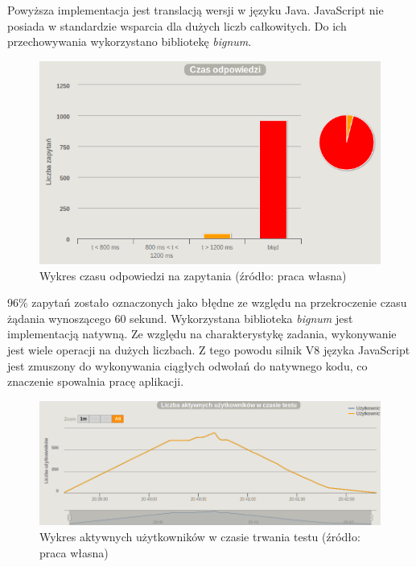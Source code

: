\documentclass[12pt,twoside]{article}
\begin{document}
Powyższa implementacja jest translacją wersji w języku Java. JavaScript
nie posiada w standardzie wsparcia dla dużych liczb całkowitych. Do ich
przechowywania wykorzystano bibliotekę \emph{bignum}.

\begin{figure}[htbp]
\centering
\includegraphics[resolution=150]{test_results/js/fibonacci/screenshots/response_times.png}
\caption{Wykres czasu odpowiedzi na zapytania (źródło: praca własna)}
\end{figure}

96\% zapytań zostało oznaczonych jako błędne ze względu na przekroczenie
czasu żądania wynoszącego 60 sekund. Wykorzystana biblioteka
\emph{bignum} jest implementacją natywną. Ze względu na charakterystykę
zadania, wykonywanie jest wiele operacji na dużych liczbach. Z tego
powodu silnik V8 języka JavaScript jest zmuszony do wykonywania ciągłych
odwołań do natywnego kodu, co znaczenie spowalnia pracę aplikacji.

\begin{figure}[htbp]
\centering
\includegraphics[resolution=150]{test_results/js/fibonacci/screenshots/active_users.png}
\caption{Wykres aktywnych użytkowników w czasie trwania testu (źródło: praca własna)}
\end{figure}
\end{document}
